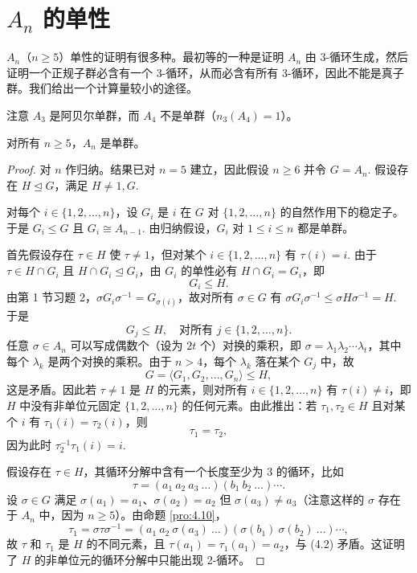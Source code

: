 \section{\(A_n\) 的单性}

\(A_n\)（\(n \geq 5\)）单性的证明有很多种。最初等的一种是证明 \(A_n\) 由 3-循环生成，然后证明一个正规子群必含有一个 3-循环，从而必含有所有 3-循环，因此不能是真子群。我们给出一个计算量较小的途径。

注意 \(A_3\) 是阿贝尔单群，而 \(A_4\) 不是单群（\(n_3(A_4) = 1\)）。

\begin{theorem}\label{thm:4.24}
对所有 \(n \geq 5\)，\(A_n\) 是单群。
\end{theorem}

\begin{proof}
对 \(n\) 作归纳。结果已对 \(n = 5\) 建立，因此假设 \(n \geq 6\) 并令 \(G = A_n\). 假设存在 \(H \trianglelefteq G\)，满足 \(H \neq 1, G\).

对每个 \(i \in \{1, 2, \ldots, n\}\)，设 \(G_i\) 是 \(i\) 在 \(G\) 对 \(\{1, 2, \ldots, n\}\) 的自然作用下的稳定子。于是 \(G_i \leq G\) 且 \(G_i \cong A_{n-1}\). 由归纳假设，\(G_i\) 对 \(1 \leq i \leq n\) 都是单群。

首先假设存在 \(\tau \in H\) 使 \(\tau \neq 1\)，但对某个 \(i \in \{1, 2, \ldots, n\}\) 有 \(\tau(i) = i\). 由于 \(\tau \in H \cap G_i\) 且 \(H \cap G_i \trianglelefteq G_i\)，由 \(G_i\) 的单性必有 \(H \cap G_i = G_i\)，即
\[
G_i \leq H.
\]
由第 1 节习题 2，\(\sigma G_i \sigma^{-1} = G_{\sigma(i)}\)，故对所有 \(\sigma \in G\) 有 \(\sigma G_i \sigma^{-1} \leq \sigma H \sigma^{-1} = H\). 于是
\[
G_j \leq H, \quad \text{对所有 } j \in \{1, 2, \ldots, n\}.
\]
任意 \(\sigma \in A_n\) 可以写成偶数个（设为 \(2t\) 个）对换的乘积，即 \(\sigma = \lambda_1\lambda_2\cdots\lambda_t\)，其中每个 \(\lambda_k\) 是两个对换的乘积。由于 \(n > 4\)，每个 \(\lambda_k\) 落在某个 \(G_j\) 中，故
\[
G = \langle G_1, G_2, \ldots, G_n \rangle \leq H,
\]
这是矛盾。因此若 \(\tau \neq 1\) 是 \(H\) 的元素，则对所有 \(i \in \{1, 2, \ldots, n\}\) 有 \(\tau(i) \neq i\)，即 \(H\) 中没有非单位元固定 \(\{1, 2, \ldots, n\}\) 的任何元素。由此推出：若 \(\tau_1, \tau_2 \in H\) 且对某个 \(i\) 有 \(\tau_1(i) = \tau_2(i)\)，则
\[
\tau_1 = \tau_2, \tag{4.2}
\]
因为此时 \(\tau_2^{-1}\tau_1(i) = i\).

假设存在 \(\tau \in H\)，其循环分解中含有一个长度至少为 3 的循环，比如
\[
\tau = (a_1\ a_2\ a_3\ \ldots)(b_1\ b_2\ \ldots)\cdots .
\]
设 \(\sigma \in G\) 满足 \(\sigma(a_1) = a_1\)、\(\sigma(a_2) = a_2\) 但 \(\sigma(a_3) \neq a_3\)（注意这样的 \(\sigma\) 存在于 \(A_n\) 中，因为 \(n \geq 5\)）。由命题 \ref{pro:4.10}，
\[
\tau_1 = \sigma\tau\sigma^{-1} = (a_1\ a_2\ \sigma(a_3)\ \ldots)(\sigma(b_1)\ \sigma(b_2)\ \ldots)\cdots,
\]
故 \(\tau\) 和 \(\tau_1\) 是 \(H\) 的不同元素，且 \(\tau(a_1) = \tau_1(a_1) = a_2\)，与 (4.2) 矛盾。这证明了 \(H\) 的非单位元的循环分解中只能出现 2-循环。


\end{proof}
